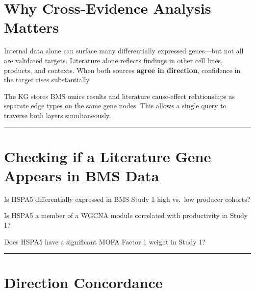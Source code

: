 \documentclass[
  letterpaper,
  oneside,
  open=any]{scrbook}
\begin{document}
\section{Why Cross-Evidence Analysis
Matters}\label{why-cross-evidence-analysis-matters}

Internal data alone can surface many differentially expressed
genes---but not all are validated targets. Literature alone reflects
findings in other cell lines, products, and contexts. When both sources
\textbf{agree in direction}, confidence in the target rises
substantially.

\begin{tcolorbox}[enhanced jigsaw, arc=.35mm, bottomrule=.15mm, bottomtitle=1mm, breakable, colback=white, colbacktitle=quarto-callout-note-color!10!white, colframe=quarto-callout-note-color-frame, coltitle=black, left=2mm, leftrule=.75mm, opacityback=0, opacitybacktitle=0.6, rightrule=.15mm, title=\textcolor{quarto-callout-note-color}{\faInfo}\hspace{0.5em}{Note}, titlerule=0mm, toprule=.15mm, toptitle=1mm]

The KG stores BMS omics results and literature cause-effect
relationships as separate edge types on the same gene nodes. This allows
a single query to traverse both layers simultaneously.

\end{tcolorbox}

\begin{center}\rule{0.5\linewidth}{0.5pt}\end{center}

\section{Checking if a Literature Gene Appears in BMS
Data}\label{checking-if-a-literature-gene-appears-in-bms-data}

Is HSPA5 differentially expressed in BMS Study 1 high vs.~low producer
cohorts?

Is HSPA5 a member of a WGCNA module correlated with productivity in
Study 1?

Does HSPA5 have a significant MOFA Factor 1 weight in Study 1?

\begin{center}\rule{0.5\linewidth}{0.5pt}\end{center}

\section{Direction Concordance}\label{direction-concordance}
\end{document}

